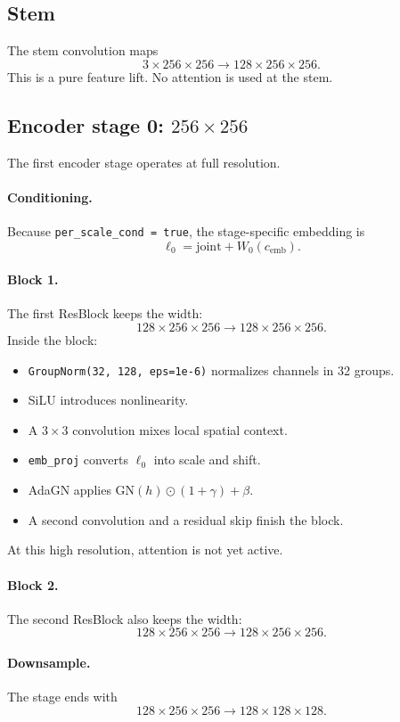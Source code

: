 \documentclass[11pt]{article}
\begin{document}
\subsection{Stem}
The stem convolution maps
\[
3 \times 256 \times 256 \to 128 \times 256 \times 256.
\]
This is a pure feature lift. No attention is used at the stem.

\subsection{Encoder stage 0: $256 \times 256$}
The first encoder stage operates at full resolution.
\paragraph{Conditioning.}
Because \texttt{per\_scale\_cond = true}, the stage-specific embedding is
\[
\ell_0 = \mathrm{joint} + W_0(c_{\mathrm{emb}}).
\]
\paragraph{Block 1.}
The first ResBlock keeps the width:
\[
128 \times 256 \times 256 \to 128 \times 256 \times 256.
\]
Inside the block:
\begin{itemize}
  \item \texttt{GroupNorm(32, 128, eps=1e-6)} normalizes channels in 32 groups.
  \item SiLU introduces nonlinearity.
  \item A $3 \times 3$ convolution mixes local spatial context.
  \item \texttt{emb\_proj} converts $\ell_0$ into scale and shift.
  \item AdaGN applies $\mathrm{GN}(h)\odot (1+\gamma) + \beta$.
  \item A second convolution and a residual skip finish the block.
\end{itemize}
At this high resolution, attention is not yet active.

\paragraph{Block 2.}
The second ResBlock also keeps the width:
\[
128 \times 256 \times 256 \to 128 \times 256 \times 256.
\]

\paragraph{Downsample.}
The stage ends with
\[
128 \times 256 \times 256 \to 128 \times 128 \times 128.
\]
\end{document}
